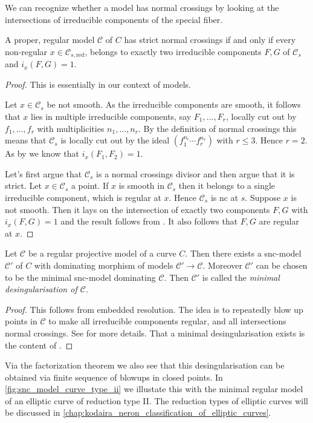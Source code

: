 We can recognize whether a model has normal crossings by looking at the intersections of irreducible components of the special fiber. 

\begin{proposition}
	A proper, regular model $\mathscr C$ of $C$ has strict normal crossings if and only if every non-regular $x \in \mathscr C_{s, \text{red}}$, belongs to exactly two irreducible components $F, G$ of $\mathscr C_s$ and $i_x(F, G) = 1$.  
\end{proposition}
\begin{proof}
	This is essentially \cite[prop.\ 9.1.8.(b)]{liuAlgebraicGeometryArithmetic2002} in our context of models. 

	\ltr Let $x \in \mathscr C_s$ be not smooth. 
	As the irreducible components are smooth, it follows that $x$ lies in multiple irreducible components, say $F_1, \ldots, F_r$, locally cut out by $f_1, \ldots, f_r$ with multiplicities $n_1, \ldots, n_r$. 
	By the definition of normal crossings this means that  $\mathscr C_s$ is locally cut out by the ideal $(f_1^{n_i}\cdots f_r^{n_r})$ with $r \le 3$. Hence  $r = 2$. 
	As by \cite[prop.\ 9.1.8.(b)]{liuAlgebraicGeometryArithmetic2002} we know that $i_x(F_1, F_2) = 1$. 

	\rtl Let's first argue that $\mathscr C_s$ is a normal crossings divisor and then argue that it is strict.
	Let $x \in \mathscr C_s$ a point. If $x$ is smooth in $\mathscr C_s$ then it belongs to a single irreducible component, which is regular at $x$. 
	Hence $\mathscr C_s$ is nc at $s$. 
	Suppose  $x$ is not smooth. Then it lays on the intersection of exactly two components $F, G$ with $i_x(F, G) = 1$ and the result follows from \cite[prop.\ 9.1.8.(b)]{liuAlgebraicGeometryArithmetic2002}.
	It also follows that $F, G$ are regular at $x$.
\end{proof}

\begin{theorem}\label{thm:desingularisation}
	Let $\mathscr C$ be a regular projective model of a curve $C$.
	Then there exists a snc-model $\mathscr C'$ of $C$ with dominating morphism of models $\mathscr C' \to \mathscr C$. 
	Moreover $\mathscr C'$ can be chosen to be the minimal snc-model dominating $\mathscr C$. 
	Then $\mathscr C'$ is called the \emph{minimal desingularisation of $\mathscr C$}. 
\end{theorem}
\begin{proof}
	This follows from embedded resolution. 
	The idea is to repeatedly blow up points in $\mathscr C$ to make all irreducible components regular, and all intersections normal crossings. 
	See \cite[sec.\ 9.2.4]{liuAlgebraicGeometryArithmetic2002} for more details.
	That a minimal desingularisation exists is the content of \cite[prop.\ 9.3.32]{liuAlgebraicGeometryArithmetic2002}.
\end{proof}
Via the factorization theorem we also see that this desingularisation can be obtained via finite sequence of blowups in closed points. 
In \cref{fig:snc_model_curve_type_ii} we illustate this with the minimal regular model of an elliptic curve of reduction type II. 
The reduction types of elliptic curves will be discussed in \cref{chap:kodaira_neron_classification_of_elliptic_curves}.

